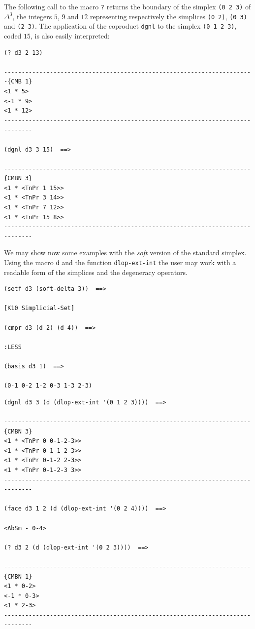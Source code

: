 The following  call to the macro {\tt ?} returns the boundary of the simplex {\tt (0 2 3)}
of $\Delta^3$, the integers $5$, $9$ and $12$ representing respectively the simplices
{\tt (0 2)}, {\tt (0 3)} and {\tt (2 3)}. The application of the coproduct {\tt dgnl} to the
simplex {\tt (0 1 2 3)}, coded $15$, is also easily interpreted:
{\footnotesize\begin{verbatim}
(? d3 2 13)

-----------------------------------------------------------------------{CMB 1}
<1 * 5>
<-1 * 9>
<1 * 12>
------------------------------------------------------------------------------

(dgnl d3 3 15)  ==>

----------------------------------------------------------------------{CMBN 3}
<1 * <TnPr 1 15>>
<1 * <TnPr 3 14>>
<1 * <TnPr 7 12>>
<1 * <TnPr 15 8>>
------------------------------------------------------------------------------
\end{verbatim}}
We may show now some examples with the {\it soft} version of the standard
simplex. Using the macro {\tt d} and the function {\tt dlop-ext-int} the user may work
with a readable form of the simplices and the degeneracy operators.
{\footnotesize\begin{verbatim}
(setf d3 (soft-delta 3))  ==>

[K10 Simplicial-Set]

(cmpr d3 (d 2) (d 4))  ==>

:LESS

(basis d3 1)  ==>

(0-1 0-2 1-2 0-3 1-3 2-3)
\end{verbatim}}
\newpage
{\footnotesize\begin{verbatim}
(dgnl d3 3 (d (dlop-ext-int '(0 1 2 3))))  ==>

----------------------------------------------------------------------{CMBN 3}
<1 * <TnPr 0 0-1-2-3>>
<1 * <TnPr 0-1 1-2-3>>
<1 * <TnPr 0-1-2 2-3>>
<1 * <TnPr 0-1-2-3 3>>
------------------------------------------------------------------------------

(face d3 1 2 (d (dlop-ext-int '(0 2 4))))  ==>

<AbSm - 0-4>

(? d3 2 (d (dlop-ext-int '(0 2 3))))  ==>

----------------------------------------------------------------------{CMBN 1}
<1 * 0-2>
<-1 * 0-3>
<1 * 2-3>
------------------------------------------------------------------------------
\end{verbatim}}
\newpage

